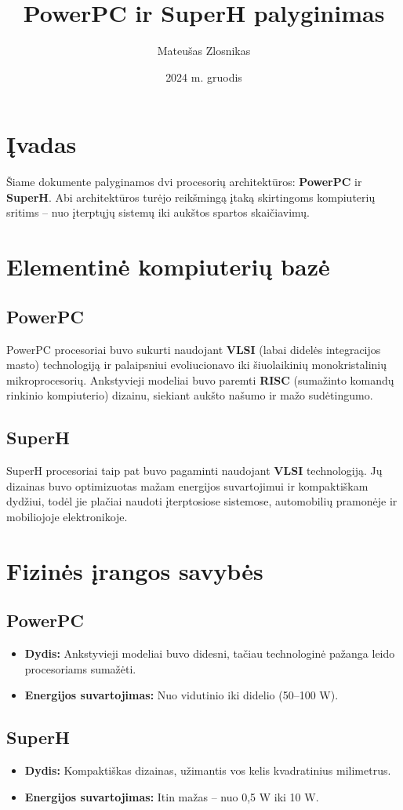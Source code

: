\documentclass{article}
\title{PowerPC ir SuperH palyginimas}
\author{Mateušas Zlosnikas}
\date{2024 m. gruodis}
\begin{document}
\maketitle

\tableofcontents %

\section{Įvadas}
Šiame dokumente palyginamos dvi procesorių architektūros: \textbf{PowerPC} ir \textbf{SuperH}. Abi architektūros turėjo reikšmingą įtaką skirtingoms kompiuterių sritims – nuo įterptųjų sistemų iki aukštos spartos skaičiavimų.

\section{Elementinė kompiuterių bazė}
\subsection{PowerPC}
PowerPC procesoriai buvo sukurti naudojant \textbf{VLSI} (labai didelės integracijos masto) technologiją ir palaipsniui evoliucionavo iki šiuolaikinių monokristalinių mikroprocesorių. Ankstyvieji modeliai buvo paremti \textbf{RISC} (sumažinto komandų rinkinio kompiuterio) dizainu, siekiant aukšto našumo ir mažo sudėtingumo.

\subsection{SuperH}
SuperH procesoriai taip pat buvo pagaminti naudojant \textbf{VLSI} technologiją. Jų dizainas buvo optimizuotas mažam energijos suvartojimui ir kompaktiškam dydžiui, todėl jie plačiai naudoti įterptosiose sistemose, automobilių pramonėje ir mobiliojoje elektronikoje.

\section{Fizinės įrangos savybės}
\subsection{PowerPC}
\begin{itemize}
    \item \textbf{Dydis:} Ankstyvieji modeliai buvo didesni, tačiau technologinė pažanga leido procesoriams sumažėti.
    \item \textbf{Energijos suvartojimas:} Nuo vidutinio iki didelio (50–100 W).
\end{itemize}

\subsection{SuperH}
\begin{itemize}
    \item \textbf{Dydis:} Kompaktiškas dizainas, užimantis vos kelis kvadratinius milimetrus.
    \item \textbf{Energijos suvartojimas:} Itin mažas – nuo 0,5 W iki 10 W.
\end{itemize}


 
\end{document}
